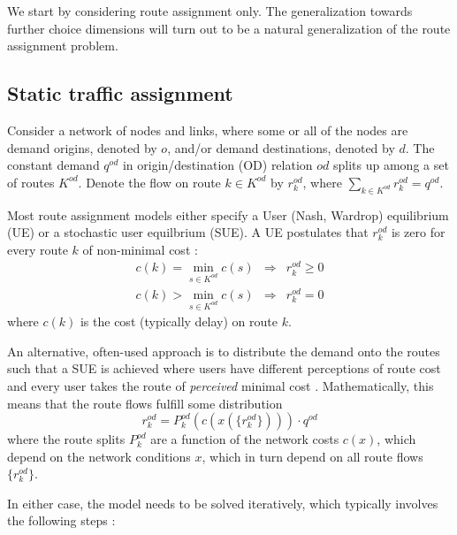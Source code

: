 We start by considering route assignment only. The generalization towards further choice dimensions will turn out to be a natural generalization of the route assignment problem.

\subsection{\label{static-macro-assignment}Static traffic assignment}

Consider a network of nodes and links, where some or all of the nodes are demand origins, denoted by $o$, and/or demand destinations, denoted by $d$. The constant demand $q^{od}$ in origin/destination (OD) relation $od$ splits up among a set of routes $K^{od}$. Denote the flow on route $k\in K^{od}$ by $r^{od}_k$, where $\sum_{k\in K^{od}} r^{od}_k = q^{od}$.

Most route assignment models either specify a User (Nash, Wardrop) equilibrium (UE) 
or a stochastic user equilbrium (SUE).  
A UE postulates that $r^{od}_k$ is zero for every route $k$ of non-minimal cost \citep{Wardrop1952TheoreticalAspects}:
\begin{eqnarray}
c(k)=\min_{s\in K^{od}}c(s) & \Rightarrow & r^{od}_{k}\geq0\\
c(k)>\min_{s\in K^{od}}c(s) & \Rightarrow & r^{od}_{k}=0
\end{eqnarray}
where $c(k)$ is the cost (typically delay) on route $k$.
 
An alternative, often-used approach is to distribute the demand onto
the routes such that a SUE is
achieved where users have different perceptions of route cost and
every user takes the route of \emph{perceived} minimal cost \citep{daganzo-1977}.
Mathematically, this means that the route flows fulfill some distribution
\begin{equation}
r^{od}_k = P^{od}_k(c(x(\{r^{od}_k\}))) \cdot q^{od}
\label{stoch-equil}
\end{equation}
where the route splits $P^{od}_k$ are a function of the network costs
$c(x)$, which depend on the network conditions $x$,
which in turn depend on all route flows $\{r^{od}_k\}$.

In either case, the model needs to be solved iteratively, 
which typically involves the following steps \citep{sheffi-1985}:

